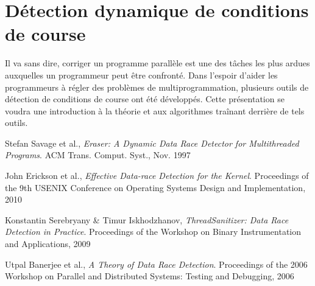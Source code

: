 \documentclass{article}
\begin{document}
\newpage

\section*{Détection dynamique de conditions de course}
Il va sans dire, corriger un programme parallèle est une des tâches les plus ardues auxquelles un programmeur peut être confronté. Dans l'espoir d'aider les programmeurs à régler des problèmes de multiprogrammation, plusieurs outils de détection de conditions de course ont été développés. Cette présentation se voudra une introduction à la théorie et aux algorithmes traînant derrière de tels outils.
\renewcommand\refname{Références TSan}
\begin{thebibliography}{9}
          Stefan Savage et al.,
          \emph{Eraser: A Dynamic Data Race Detector for Multithreaded Programs}.
          ACM Trans. Comput. Syst., Nov. 1997
          
          John Erickson et al.,
          \emph{Effective Data-race Detection for the Kernel}.
          Proceedings of the 9th USENIX Conference on Operating Systems Design and Implementation, 2010
          
          Konstantin Serebryany \& Timur Iskhodzhanov,
          \emph{ThreadSanitizer: Data Race Detection in Practice}.
          Proceedings of the Workshop on Binary Instrumentation and Applications, 2009
          
          Utpal Banerjee et al.,
          \emph{A Theory of Data Race Detection}.
          Proceedings of the 2006 Workshop on Parallel and Distributed Systems: Testing and Debugging, 2006
         
\end{thebibliography}

\newpage
\end{document}
